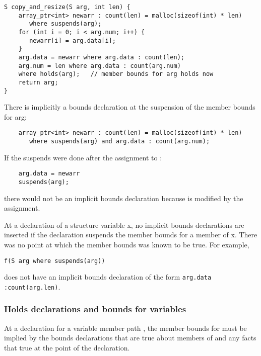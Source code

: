 \begin{lstlisting}
S copy_and_resize(S arg, int len) {
    array_ptr<int> newarr : count(len) = malloc(sizeof(int) * len)
       where suspends(arg);
    for (int i = 0; i < arg.num; i++) {
       newarr[i] = arg.data[i];
    }
    arg.data = newarr where arg.data : count(len);
    arg.num = len where arg.data : count(arg.num)
    where holds(arg);   // member bounds for arg holds now
    return arg;
}
\end{lstlisting}


There is implicitly a bounds declaration at the suspension of the member
bounds for arg:

\begin{lstlisting}
    array_ptr<int> newarr : count(len) = malloc(sizeof(int) * len)
       where suspends(arg) and arg.data : count(arg.num);
\end{lstlisting}

If the suspends were done after the assignment to :

\begin{lstlisting}
    arg.data = newarr
    suspends(arg);
\end{lstlisting}

there would not be an implicit bounds declaration because  is
modified by the assignment.

At a declaration of a structure variable x, no implicit bounds
declarations are inserted if the declaration suspends the member bounds
for a member of x. There was no point at which the member bounds was
known to be true. For example,

\begin{lstlisting}
f(S arg where suspends(arg))
\end{lstlisting}

does not have an implicit bounds declaration of the form \lstinline|arg.data :count(arg.len)|.

\subsubsection{Holds declarations and bounds for variables}

At a  declaration for a variable member path ,
the member bounds for  must be implied by the bounds
declarations that are true about members of  and any facts that 
true at the point of the  declaration.





